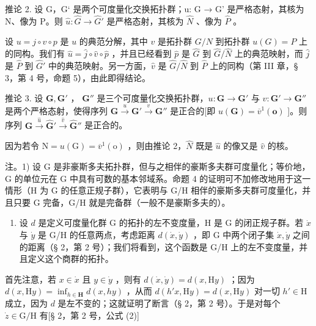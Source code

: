 推论 2. 设 G，G‘ 是两个可度量化交换拓扑群；u: G → G’ 是严格态射，其核为 N、像为 P。则 \(\hat{u} : \hat{G} \rightarrow \hat{G}'\) 是严格态射，其核为 \(\hat{N}\) 、像为 \(\hat{P}\) 。

设 \(u = j \circ v \circ p\) 是 \(u\) 的典范分解，其中 \(v\) 是拓扑群 \(G/N\) 到拓扑群 \(u(G) = P\) 上的同构。我们有 \(\hat{u} = \hat{j} \circ \hat{v} \circ \hat{p}\) ，并且已经看到 \(\hat{p}\) 是 \(\hat{G}\) 到 \(\hat{G}/\hat{N}\) 上的典范映射，而 \(\hat{j}\) 是 \(\hat{P}\) 到 \(\hat{G}'\) 中的典范映射。另一方面，\(\hat{v}\) 是 \(\hat{G}/\hat{N}\) 到 \(\hat{P}\) 上的同构（第 III 章，§ 3，第 4 号，命题 5），由此即得结论。

推论 3. 设 \(\mathbf{G}, \mathbf{G}'\) ， \(\mathbf{G}''\) 是三个可度量化交换拓扑群，\(u: \mathbf{G} \to \mathbf{G}'\) 与 \(v: \mathbf{G}' \to \mathbf{G}''\) 是两个严格态射，使得序列 \(\mathbf{G} \xrightarrow{u} \mathbf{G}' \xrightarrow{v} \mathbf{G}''\) 是正合的{[}即 \(u(\mathbf{G}) = \overline{v}^{1}(\mathbf{o})\) {]}。则序列 \(\hat{\mathbf{G}} \xrightarrow{\hat{u}} \hat{\mathbf{G}}' \xrightarrow{\hat{v}} \hat{\mathbf{G}}''\) 是正合的。

因为若令 \(\mathrm{N} = u(\mathrm{G}) = \overline{v}^{1}(\mathrm{o})\) ，则由推论 2，\(\hat{N}\) 既是 \(\hat{u}\) 的像又是 \(\hat{v}\) 的核。

注。1) 设 G 是非豪斯多夫拓扑群，但与之相伴的豪斯多夫群可度量化；等价地，G 的单位元在 G 中具有可数的基本邻域系。命题 4 的证明可不加修改地用于这一情形（H 为 G 的任意正规子群），它表明与 G/H 相伴的豪斯多夫群可度量化，并且只要 G 完备，G/H 就是完备群（一般不是豪斯多夫的）。

\begin{enumerate}
\def\labelenumi{\arabic{enumi})}
\setcounter{enumi}{1}
\tightlist
\item
  设 \(d\) 是定义可度量化群 G 的拓扑的左不变度量，H 是 G 的闭正规子群。若 \(\dot{x}\) 与 \(\dot{y}\) 是 G/H 的任意两点，考虑距离 \(d(\dot{x},\dot{y})\) ，即 G 中两个闭子集 \(\dot{x},\dot{y}\) 之间的距离（§ 2，第 2 号）；我们将看到，这个函数是 G/H 上的左不变度量，并且定义这个商群的拓扑。
\end{enumerate}

首先注意，若 \(x \in \dot{x}\) 且 \(y \in \dot{y}\) ，则有 \(d(\dot{x}, \dot{y}) = d(x, \mathrm{H}y)\) ；因为 \(d(x, \mathrm{H}y) = \inf_{h \in \mathbf{H}} d(x, h y)\) ，从而 \(d(h' x, \mathrm{H} y) = d(x, \mathrm{H} y)\) 对一切 \(h' \in \mathrm{H}\) 成立，因为 \(d\) 是左不变的；这就证明了断言（§ 2，第 2 号）。于是对每个 \(\dot{z} \in \mathrm{G} / \mathrm{H}\) 有{[}§ 2，第 2 号，公式 (2){]}

